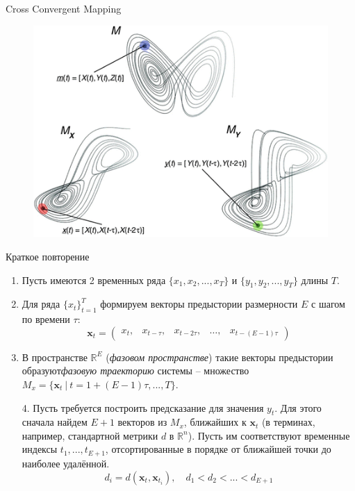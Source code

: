 \begin{frame}{Cross Convergent Mapping}
\begin{figure}
    \centering
    \includegraphics[width=\textwidth]{lecture_5/figs/CCM.png}
\end{figure}
\end{frame}
\begin{frame}{Краткое повторение}

\begin{enumerate}
    \item Пусть имеются 2 временных ряда $\{x_1, x_2,...,x_T\}$ и $\{y_1, y_2,...,y_T\}$ длины $T$.
    \item Для ряда $\{x_t\}_{t=1}^T$ формируем векторы предыстории размерности $E$ с шагом по времени $\tau$:
    $$ \mathbf{x}_t = \begin{pmatrix}
        x_t, & x_{t - \tau}, & x_{t - 2\tau}, & \dots, & x_{t - (E-1)\tau}
    \end{pmatrix}$$
    \item В пространстве $\mathbb{R}^E$ (\textit{фазовом пространстве}) такие векторы предыстории образуют\textit{фазовую траекторию} системы -- множество $M_x = \{\mathbf{x}_t \ | \ t = 1 + (E - 1)\tau, ..., T \}$.
    \item[4.] Пусть требуется построить предсказание для значения $y_t$. Для этого сначала найдем $E + 1$ векторов из $M_x$, ближайших к $\mathbf{x}_t$ (в терминах, например, стандартной метрики $d$ в $\mathbb{R}^n$). Пусть им соответствуют временные индексы $t_1, ..., t_{E+1}$, отсортированные в порядке от ближайшей точки до наиболее удалённой.
    $$ d_i = d(\mathbf{x}_t, \mathbf{x}_{t_i}), \quad d_1 < d_2 < ... < d_{E + 1}$$
\end{enumerate}

\end{frame}

